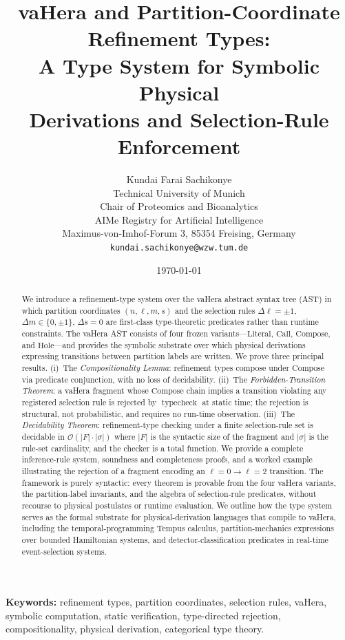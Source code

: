 \documentclass[twocolumn,11pt,a4paper]{article}
\title{\textbf{vaHera and Partition-Coordinate Refinement Types:\\[3pt]
A Type System for Symbolic Physical\\[2pt]
Derivations and Selection-Rule Enforcement}}
\author{Kundai Farai Sachikonye\\
Technical University of Munich\\
Chair of Proteomics and Bioanalytics\\
AIMe Registry for Artificial Intelligence\\
Maximus-von-Imhof-Forum 3, 85354 Freising, Germany\\
\texttt{kundai.sachikonye@wzw.tum.de}}
\date{\today}
\DeclareMathOperator{\typecheck}{typecheck}
\newcommand{\Sel}{\sigma}
\newcommand{\Frag}{F}
\begin{document}
\maketitle

\begin{abstract}
We introduce a refinement-type system over the vaHera abstract syntax tree (AST) in which partition coordinates $(n, \ell, m, s)$ and the selection rules $\Delta\ell = \pm 1$, $\Delta m \in \{0, \pm 1\}$, $\Delta s = 0$ are first-class type-theoretic predicates rather than runtime constraints. The vaHera AST consists of four frozen variants---$\mathrm{Literal}$, $\mathrm{Call}$, $\mathrm{Compose}$, and $\mathrm{Hole}$---and provides the symbolic substrate over which physical derivations expressing transitions between partition labels are written. We prove three principal results. (i)~The \emph{Compositionality Lemma}: refinement types compose under $\mathrm{Compose}$ via predicate conjunction, with no loss of decidability. (ii)~The \emph{Forbidden-Transition Theorem}: a vaHera fragment whose $\mathrm{Compose}$ chain implies a transition violating any registered selection rule is rejected by $\typecheck$ at static time; the rejection is structural, not probabilistic, and requires no run-time observation. (iii)~The \emph{Decidability Theorem}: refinement-type checking under a finite selection-rule set is decidable in $\mathcal{O}(|\Frag| \cdot |\Sel|)$ where $|\Frag|$ is the syntactic size of the fragment and $|\Sel|$ is the rule-set cardinality, and the checker is a total function. We provide a complete inference-rule system, soundness and completeness proofs, and a worked example illustrating the rejection of a fragment encoding an $\ell = 0 \to \ell = 2$ transition. The framework is purely syntactic: every theorem is provable from the four vaHera variants, the partition-label invariants, and the algebra of selection-rule predicates, without recourse to physical postulates or runtime evaluation. We outline how the type system serves as the formal substrate for physical-derivation languages that compile to vaHera, including the temporal-programming Tempus calculus, partition-mechanics expressions over bounded Hamiltonian systems, and detector-classification predicates in real-time event-selection systems.
\end{abstract}

\noindent\textbf{Keywords:} refinement types, partition coordinates, selection rules, vaHera, symbolic computation, static verification, type-directed rejection, compositionality, physical derivation, categorical type theory.
\end{document}
